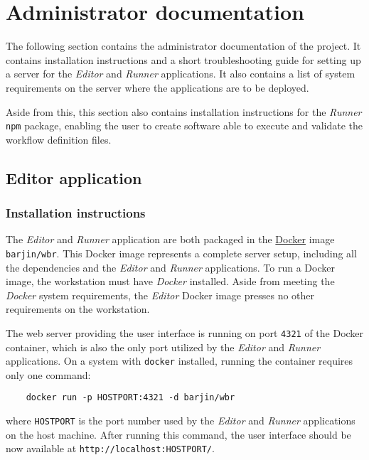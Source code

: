 
\section{Administrator documentation} \label{adminDocs}

The following section contains the administrator documentation of the project.
It contains installation instructions and a short troubleshooting guide for setting up a server for the \textit{Editor} and \textit{Runner} applications. 
It also contains a list of system requirements on the server where the applications are to be deployed.

Aside from this, this section also contains installation instructions for the \textit{Runner} \texttt{npm} package, enabling the user to create software able to execute and validate the workflow definition files.

\subsection{Editor application}


\subsubsection{Installation instructions}

The \textit{Editor} and \textit{Runner} application are both packaged in the \href{https://www.docker.com/}{Docker} image \texttt{barjin/wbr}.
This Docker image represents a complete server setup, including all the dependencies and the \textit{Editor} and \textit{Runner} applications.
To run a Docker image, the workstation must have \textit{Docker} installed. 
Aside from meeting the \textit{Docker} system requirements, the \textit{Editor} Docker image presses no other requirements on the workstation.

The web server providing the user interface is running on port \texttt{4321} of the Docker container, which is also the only port utilized by the \textit{Editor} and \textit{Runner} applications.
On a system with \texttt{docker} installed, running the container requires only one command:

\begin{verbatim}
    docker run -p HOSTPORT:4321 -d barjin/wbr
\end{verbatim}
where \texttt{HOSTPORT} is the port number used by the \textit{Editor} and \textit{Runner} applications on the host machine.
After running this command, the user interface should be now available at \texttt{http://localhost:HOSTPORT/}.

